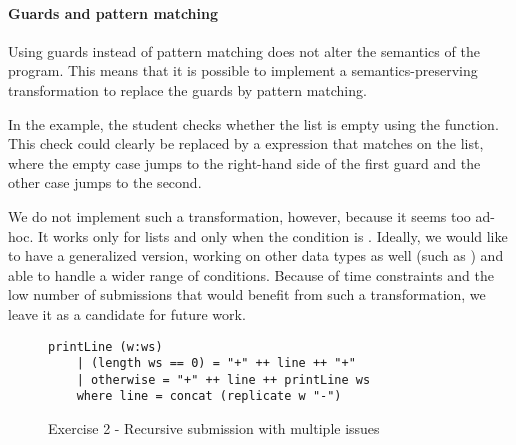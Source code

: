 \paragraph{Guards and pattern matching}

Using guards instead of pattern matching does not alter the semantics of the program. This means that it is possible to implement a semantics-preserving transformation to replace the guards by pattern matching.

In the example, the student checks whether the list is empty using the  function. This check could clearly be replaced by a  expression that matches on the list, where the empty case jumps to the right-hand side of the first guard and the other case jumps to the second.

We do not implement such a transformation, however, because it seems too ad-hoc. It works only for lists and only when the condition is . Ideally, we would like to have a generalized version, working on other data types as well (such as ) and able to handle a wider range of conditions. Because of time constraints and the low number of submissions that would benefit from such a transformation, we leave it as a candidate for future work.



\begin{figure}
\begin{verbatim}
printLine (w:ws)
    | (length ws == 0) = "+" ++ line ++ "+"
    | otherwise = "+" ++ line ++ printLine ws
    where line = concat (replicate w "-")
\end{verbatim}
\caption{Exercise 2 - Recursive submission with multiple issues}
\label{fig:ex2-reimplementation-map-guards}
\end{figure}



